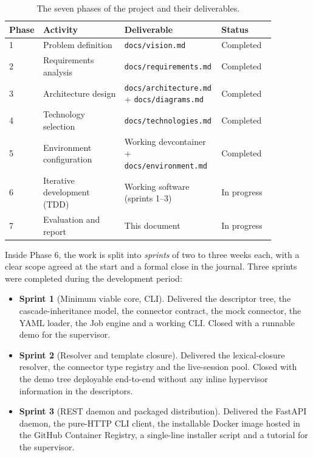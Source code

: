 \begin{table}[ht]
  \centering
  \small
  \begin{tabular}{p{0.07\linewidth} p{0.30\linewidth} p{0.30\linewidth} p{0.20\linewidth}}
    \toprule
    \textbf{Phase} & \textbf{Activity} & \textbf{Deliverable} & \textbf{Status} \\
    \midrule
    1 & Problem definition          & \texttt{docs/vision.md}        & Completed \\
    2 & Requirements analysis       & \texttt{docs/requirements.md}  & Completed \\
    3 & Architecture design         & \texttt{docs/architecture.md} + \texttt{docs/diagrams.md} & Completed \\
    4 & Technology selection        & \texttt{docs/technologies.md}  & Completed \\
    5 & Environment configuration   & Working devcontainer + \texttt{docs/environment.md} & Completed \\
    6 & Iterative development (TDD) & Working software (sprints 1--3) & In progress \\
    7 & Evaluation and report       & This document                   & In progress \\
    \bottomrule
  \end{tabular}
  \caption{The seven phases of the project and their deliverables.}
  \label{tab:phases}
\end{table}

Inside Phase 6, the work is split into \emph{sprints} of two to
three weeks each, with a clear scope agreed at the start and a
formal close in the journal. Three sprints were completed during the
development period:

\begin{itemize}
  \item \textbf{Sprint 1} (Minimum viable core, CLI). Delivered the
        descriptor tree, the cascade-inheritance model, the
        connector contract, the mock connector, the YAML loader, the
        Job engine and a working CLI. Closed with a runnable demo
        for the supervisor.
  \item \textbf{Sprint 2} (Resolver and template closure). Delivered
        the lexical-closure resolver, the connector type registry
        and the live-session pool. Closed with the demo tree
        deployable end-to-end without any inline hypervisor
        information in the descriptors.
  \item \textbf{Sprint 3} (REST daemon and packaged distribution).
        Delivered the FastAPI daemon, the pure-HTTP CLI client, the
        installable Docker image hosted in the GitHub Container
        Registry, a single-line installer script and a tutorial for
        the supervisor.
\end{itemize}

